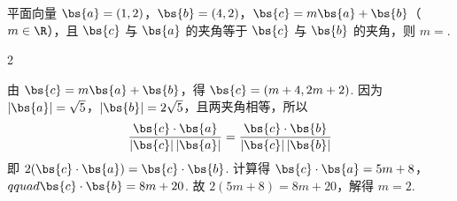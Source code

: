\begin{problem}
平面向量 \(\bs{a} = (1, 2)\)，\(\bs{b} = (4, 2)\)，\(\bs{c} = m\bs{a} + \bs{b}\)（\(m \in \R\)），且 \(\bs{c}\) 与 \(\bs{a}\) 的夹角等于 \(\bs{c}\) 与 \(\bs{b}\) 的夹角，则 \(m =\)\fillinblank{}.
\begin{answer}
2
\end{answer}

\begin{solution}
由 \(\bs{c}=m\bs{a}+\bs{b}\)，得 \(\bs{c}=(m+4,2m+2)\). 因为 \(|\bs{a}|=\sqrt5\)，\(|\bs{b}|=2\sqrt5\)，且两夹角相等，所以
\[
\frac{\bs{c}\cdot\bs{a}}{|\bs{c}|\,|\bs{a}|}=\frac{\bs{c}\cdot\bs{b}}{|\bs{c}|\,|\bs{b}|}
\]
即 \(2(\bs{c}\cdot\bs{a})=\bs{c}\cdot\bs{b}\). 计算得
\(\bs{c}\cdot\bs{a}=5m+8\)，\(qquad \bs{c}\cdot\bs{b}=8m+20\).
故 \(2(5m+8)=8m+20\)，解得 \(m=2\).
\end{solution}
\end{problem}

